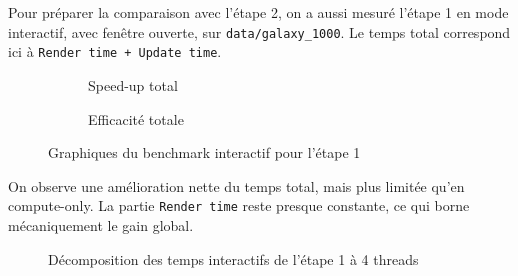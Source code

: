 Pour préparer la comparaison avec l'étape 2, on a aussi mesuré l'étape 1 en mode interactif, avec fenêtre ouverte, sur \texttt{data/galaxy\_1000}. Le temps total correspond ici à \texttt{Render time + Update time}.

\begin{table}[H]
    \centering
    \caption{Résultats du benchmark interactif pour l'étape 1}
    \label{tab:stage1_interactive}
\end{table}

\begin{figure}[H]
    \centering
    \begin{subfigure}[t]{0.48\linewidth}
        \centering
        
        \caption{Speed-up total}
        \label{fig:stage1_interactive_speedup}
    \end{subfigure}
    \hfill
    \begin{subfigure}[t]{0.48\linewidth}
        \centering
        
        \caption{Efficacité totale}
        \label{fig:stage1_interactive_efficiency}
    \end{subfigure}
    \caption{Graphiques du benchmark interactif pour l'étape 1}
    \label{fig:stage1_interactive_scaling}
\end{figure}

On observe une amélioration nette du temps total, mais plus limitée qu'en compute-only. La partie \texttt{Render time} reste presque constante, ce qui borne mécaniquement le gain global.

\begin{figure}[H]
    \centering
    
    \caption{Décomposition des temps interactifs de l'étape 1 à 4 threads}
    \label{fig:stage1_interactive}
\end{figure}
